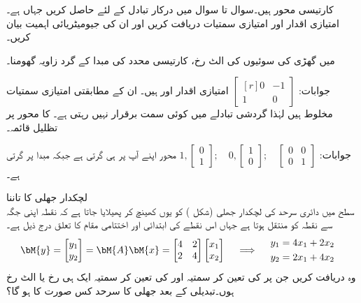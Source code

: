  کارتیسی محور ہیں۔سوال  تا سوال   میں درکار تبادل  کے لئے  حاصل کریں جہاں  ہے۔امتیازی اقدار اور امتیازی سمتیات دریافت کریں اور ان کی جیومیٹریائی اہمیت بیان کریں۔


 میں گھڑی کی سوئیوں کی الٹ رخ، کارتیسی محدد کی مبدا کے گرد   زاویہ گھومنا۔

جوابات:
$\begin{bmatrix*}[r] 0&-1\\1&0  \end{bmatrix*}$
امتیازی اقدار  اور   ہیں۔ ان کے مطابقتی امتیازی سمتیات مخلوط ہیں لہٰذا گردشی تبادلے میں کوئی سمت برقرار نہیں رہتی ہے۔
 کا  محور پر تظلیل قائمہ۔

جوابات:
$1,\begin{bmatrix} 0\\1 \end{bmatrix}; \quad 0,\begin{bmatrix} 1\\0 \end{bmatrix};\quad \begin{bmatrix}0&0\\0&1  \end{bmatrix}$
محور  اپنے آپ پر ہی گرتی ہے جبکہ  مبدا پر گرتی ہے۔


\quad لچکدار جھلی کا تاننا\\
 سطح میں دائری سرحد  کی لچکدار جھلی (شکل ) کو یوں کھینچ کر پھیلایا جاتا ہے کہ نقطہ  اپنی جگہ سے  نقطہ   کو منتقل ہوتا ہے جہاں اس نقطے کی ابتدائی اور اختتامی  مقام کا تعلق درج ذیل ہے۔
\begin{gather*}
\bM{y}=\begin{bmatrix} y_1\\y_2 \end{bmatrix}=\bM{A}\bM{x}=\begin{bmatrix}4&2\\2&4  \end{bmatrix}\begin{bmatrix} x_1\\x_2 \end{bmatrix}\quad \implies \quad \begin{aligned}y_1&=4x_1+2x_2\\y_2&=2x_1+4x_2&  \end{aligned}
\end{gather*}
وہ  دریافت کریں جن پر  کی تعین کر سمتیہ اور  کی تعین کر سمتیہ ایک ہی رخ یا الٹ رخ ہوں۔تبدیلی کے بعد جھلی کا سرحد کس صورت کا ہو گا؟

